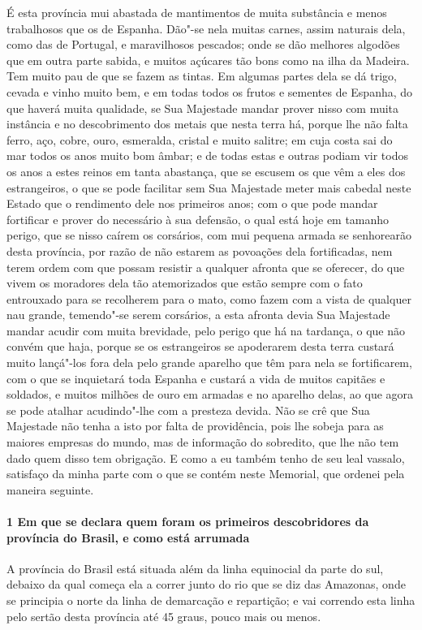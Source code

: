 \begin{linenumbers}
É esta província mui abastada de mantimentos de muita substância e menos trabalhosos que
os de Espanha. Dão"-se nela muitas carnes, assim naturais dela, como das de Portugal, e
maravilhosos pescados; onde se dão melhores algodões que em outra parte sabida, e muitos
açúcares tão bons como na ilha da Madeira. Tem muito pau de que se fazem as tintas. Em
algumas partes dela se dá trigo, cevada e vinho muito bem, e em todas todos os frutos e
sementes de Espanha, do que haverá muita qualidade, se Sua Majestade mandar prover nisso
com muita instância e no descobrimento dos metais que nesta terra há, porque lhe não falta
ferro, aço, cobre, ouro, esmeralda, cristal e muito salitre; em cuja costa sai do mar
todos os anos muito bom âmbar; e de todas estas e outras podiam vir todos os anos a estes
reinos em tanta abastança, que se escusem os que vêm a eles dos estrangeiros, o que se
pode facilitar sem Sua Majestade meter mais cabedal neste Estado que o rendimento dele nos
primeiros anos; com o que pode mandar fortificar e prover do necessário à sua defensão, o
qual está hoje em tamanho perigo, que se nisso caírem os corsários, com mui pequena armada
se senhorearão desta província, por razão de não estarem as povoações dela fortificadas,
nem terem ordem com que possam resistir a qualquer afronta que se oferecer, do que vivem
os moradores dela tão atemorizados que estão sempre com o fato entrouxado para se
recolherem para o mato, como fazem com a vista de qualquer nau grande, temendo"-se serem
corsários, a esta afronta devia Sua Majestade mandar acudir com muita brevidade, pelo
perigo que há na tardança, o que não convém que haja, porque se os estrangeiros se
apoderarem desta terra custará muito lançá"-los fora dela pelo grande aparelho que têm para
nela se fortificarem, com o que se inquietará toda Espanha e custará a vida de muitos
capitães e soldados, e muitos milhões de ouro em armadas e no aparelho delas, ao que agora
se pode atalhar acudindo"-lhe com a presteza devida. Não se crê que Sua Majestade não tenha
a isto por falta de providência, pois lhe sobeja para as maiores empresas do mundo, mas de
informação do sobredito, que lhe não tem dado quem disso tem obrigação. E como a eu também
tenho de seu leal vassalo, satisfaço da minha parte com o que se contém neste Memorial,
que ordenei pela maneira seguinte.

\paragraph{1 Em que se declara quem foram os primeiros descobridores da província do
Brasil, e como está arrumada} \quad
A província do Brasil está situada além da linha equinocial da parte do sul, debaixo da
qual começa ela a correr junto do rio que se diz das Amazonas, onde se principia o norte
da linha de demarcação e repartição; e vai correndo esta linha pelo sertão desta província
até 45 graus, pouco mais ou menos.


\end{linenumbers}
